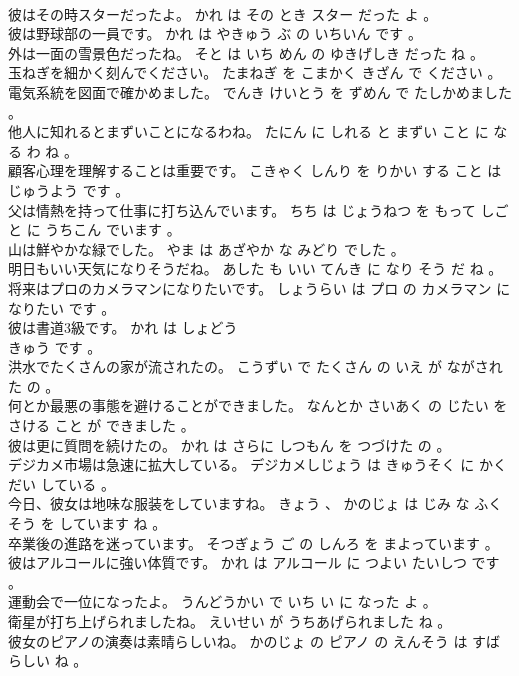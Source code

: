 \documentclass[8pt]{extreport}
\begin{document}
\begin{CJK}{UTF8}{min}
\\	彼はその時スターだったよ。	かれ は その とき スター だった よ 。 
\\	彼は野球部の一員です。	かれ は やきゅう ぶ の いちいん です 。 
\\	外は一面の雪景色だったね。	そと は いち めん の ゆきげしき だった ね 。 
\\	玉ねぎを細かく刻んでください。	たまねぎ を こまかく きざん で ください 。 
\\	電気系統を図面で確かめました。	でんき けいとう を ずめん で たしかめました 。 
\\	他人に知れるとまずいことになるわね。	たにん に しれる と まずい こと に なる わ ね 。 
\\	顧客心理を理解することは重要です。	こきゃく しんり を りかい する こと は じゅうよう です 。 
\\	父は情熱を持って仕事に打ち込んでいます。	ちち は じょうねつ を もって しごと に うちこん でいます 。 
\\	山は鮮やかな緑でした。	やま は あざやか な みどり でした 。 
\\	明日もいい天気になりそうだね。	あした も いい てんき に なり そう だ ね 。 
\\	将来はプロのカメラマンになりたいです。	しょうらい は プロ の カメラマン に なりたい です 。 
\\	彼は書道3級です。	かれ は しょどう 
\\	きゅう です 。 
\\	洪水でたくさんの家が流されたの。	こうずい で たくさん の いえ が ながされた の 。 
\\	何とか最悪の事態を避けることができました。	なんとか さいあく の じたい を さける こと が できました 。 
\\	彼は更に質問を続けたの。	かれ は さらに しつもん を つづけた の 。 
\\	デジカメ市場は急速に拡大している。	デジカメしじょう は きゅうそく に かくだい している 。 
\\	今日、彼女は地味な服装をしていますね。	きょう 、 かのじょ は じみ な ふくそう を しています ね 。 
\\	卒業後の進路を迷っています。	そつぎょう ご の しんろ を まよっています 。 
\\	彼はアルコールに強い体質です。	かれ は アルコール に つよい たいしつ です 。 
\\	運動会で一位になったよ。	うんどうかい で いち い に なった よ 。 
\\	衛星が打ち上げられましたね。	えいせい が うちあげられました ね 。 
\\	彼女のピアノの演奏は素晴らしいね。	かのじょ の ピアノ の えんそう は すばらしい ね 。 

\end{CJK}
\end{document}
